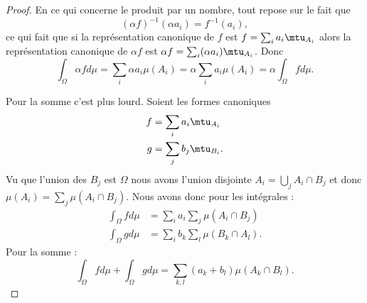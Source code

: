 \begin{proof}
    En ce qui concerne le produit par un nombre, tout repose sur le fait que
    \begin{equation}
        (\alpha f)^{-1}(\alpha a_i)=f^{-1}(a_i),
    \end{equation}
    ce qui fait que si la représentation canonique de \( f\) est \( f=\sum_ia_i\mtu_{A_i}\) alors la représentation canonique de \( \alpha f\) est \( \alpha f=\sum_i(\alpha a_i)\mtu_{A_i}\). Donc
    \begin{equation}
        \int_{\Omega}\alpha fd\mu=\sum_i\alpha a_i\mu(A_i)=\alpha \sum_ia_i\mu(A_i)=\alpha\int_{\Omega}fd\mu.
    \end{equation}

    Pour la somme c'est plus lourd. Soient les formes canoniques
    \begin{subequations}
        \begin{align}
            f&=\sum_ia_i\mtu_{A_i}\\
            g&=\sum_jb_j\mtu_{B_i}.
        \end{align}
    \end{subequations}
    Vu que l'union des \( B_j\) est \( \Omega\) nous avons l'union disjointe \( A_i=\bigcup_jA_i\cap B_j\) et donc \( \mu(A_i)=\sum_j\mu(A_i\cap B_j)\). Nous avons donc pour les intégrales :
    \begin{subequations}
        \begin{align}
            \int_{\Omega}fd\mu&=\sum_ia_i\sum_j\mu(A_i\cap B_j)\\
            \int_{\Omega}gd\mu&=\sum_ib_k\sum_l\mu(B_k\cap A_l).
        \end{align}
    \end{subequations}
    Pour la somme :
    \begin{equation}
        \int_{\Omega}fd\mu+\int_{\Omega}gd\mu=\sum_{k,l}(a_k+b_l)\mu(A_k\cap B_l).
    \end{equation}


\end{proof}
